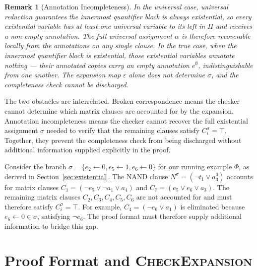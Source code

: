 \documentclass{article}
\newtheorem*{remark}{Remark}
\begin{document}
\begin{remark}[Annotation Incompleteness]
    \label{rem:annotation}
    In the universal case, universal reduction guarantees the innermost quantifier
    block is always existential, so every existential variable has at least one
    universal variable to its left in $\Pi$ and receives a non-empty annotation.
    The full universal assignment $\alpha$ is therefore recoverable locally from
    the annotations on any single clause. In the true case, when the innermost
    quantifier block is existential, those existential variables annotate nothing
    --- their annotated copies carry an empty annotation $e^{\emptyset}$,
    indistinguishable from one another. The expansion map $\varepsilon$ alone does
    not determine $\sigma$, and the completeness check cannot be discharged.
\end{remark}

The two obstacles are interrelated. Broken correspondence means the checker cannot
determine which matrix clauses are accounted for by the expansion. Annotation
incompleteness means the checker cannot recover the full existential assignment
$\sigma$ needed to verify that the remaining clauses satisfy $C_i^\sigma = \top$.
Together, they prevent the completeness check from being discharged without
additional information supplied explicitly in the proof.

Consider the branch $\sigma = \{e_2 \leftarrow 0, e_5 \leftarrow 1, e_6
    \leftarrow 0\}$ for our running example $\Phi$, as derived in
Section~\ref{sec:existential}. The NAND clause $N^\sigma = (\neg t_1 \vee a_3^0)$
accounts for matrix clauses $C_1 = (\neg e_5 \vee \neg a_1 \vee a_4)$ and $C_7
    = (e_5 \vee e_6 \vee a_3)$. The remaining matrix clauses $C_2, C_3, C_4, C_5,
    C_6$ are not accounted for and must therefore satisfy $C_i^\sigma = \top$. For
example, $C_4 = (\neg e_6 \vee a_1)$ is eliminated because $e_6 \leftarrow 0
    \in \sigma$, satisfying $\neg e_6$. The proof format must therefore supply
additional information to bridge this gap.


\section{Proof Format and \textsc{CheckExpansion}}
\label{sec:format}
\end{document}

